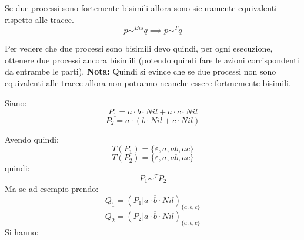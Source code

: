 \begin{definizione}
  Se due processi sono fortemente bisimili allora sono sicuramente equivalenti
  rispetto alle tracce. 
  \[p\sim^{Bis}q \implies p\sim^{T}q\]
\end{definizione} \vspace{5mm} %
Per vedere che due processi sono bisimili devo quindi, per ogni esecuzione,
ottenere due processi ancora bisimili (potendo quindi fare le azioni
corrispondenti da entrambe le parti). 
\textbf{Nota: } Quindi si evince che se due processi non sono equivalenti alle tracce allora non potranno neanche essere fortmemente bisimili.
\begin{esempio}
  Siano:
  \[P_1=a\cdot b\cdot Nil+a\cdot c\cdot Nil\]
  \[P_2=a\cdot(b\cdot Nil+c\cdot Nil)\]
  \begin{center}
  \end{center}
  \begin{center}
  \end{center}
  Avendo quindi:
  \[T(P_1)=\{\varepsilon, a, ab, ac\}\]
  \[T(P_2)=\{\varepsilon, a, ab, ac\}\]
  quindi:
  \[P_1\sim^T P_2\]
  Ma se ad esempio prendo:
  \[Q_1=(P_1|\overline{a}\cdot \overline{b}\cdot Nil )_{\{a, b, c\}}\]
  \[Q_2=(P_2|\overline{a}\cdot \overline{b}\cdot Nil )_{\{a, b, c\}}\]
  Si hanno:
   \begin{center}
\end{center}
\end{esempio}
